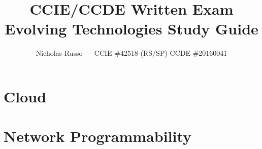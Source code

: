 \documentclass{article}
\title{CCIE/CCDE Written Exam Evolving Technologies Study Guide}
\author{Nicholas Russo --- CCIE \#42518 (RS/SP) CCDE \#20160041}
\begin{document}
\newcommand{\addimgnocaption}[2]{
  \begin{minipage}[t]{\linewidth}
  \centering
  \texttt{[image: \\imgpath\#1]}
  \end{minipage}
}

\newcommand{\addimg}[3]{
  \begin{minipage}[t]{\linewidth}
  \centering
  \captionsetup{type=figure}
  \texttt{[image: \\imgpath\#1]}
  \captionof{figure}{#3}
  \end{minipage}
}
\maketitle

\newpage
\begin{abstract}
\setlength\parindent{0pt}
\newcommand{\imgpath}{content/misc/img/}

\end{abstract}

\newpage
\tableofcontents
\listoffigures
\listoftables

\newpage
\section{Cloud}
\newcommand{\imgpath}{content/cloud/a1a-design/img/}






\renewcommand{\imgpath}{content/cloud/a1b-infra/img/}






\newpage
\section{Network Programmability}
\renewcommand{\imgpath}{content/netprog/a2a-archops/img/}





\end{document}
